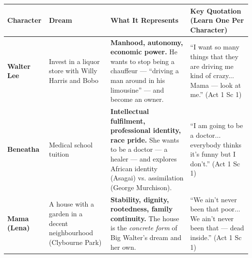 \documentclass[11pt]{article}
\begin{document}
\begin{center}
\begin{tabularx}{\linewidth}{|l|X|X|X|}\hline
\rowcolor{popblueL}
\textbf{Character} & \textbf{Dream} & \textbf{What It Represents} & \textbf{Key Quotation (Learn One Per Character)} \\ \hline
\textbf{Walter Lee} & Invest in a liquor store with Willy Harris and Bobo & \textbf{Manhood, autonomy, economic power.} He wants to stop being a chauffeur — ``driving a man around in his limousine'' — and become an owner. & ``I want so many things that they are driving me kind of crazy... Mama — look at me.'' (Act 1 Sc 1) \\ \hline
\textbf{Beneatha} & Medical school tuition & \textbf{Intellectual fulfilment, professional identity, race pride.} She wants to be a doctor — a healer — and explores African identity (Asagai) vs. assimilation (George Murchison). & ``I am going to be a doctor... everybody thinks it's funny but I don't.'' (Act 1 Sc 1) \\ \hline
\textbf{Mama (Lena)} & A house with a garden in a decent neighbourhood (Clybourne Park) & \textbf{Stability, dignity, rootedness, family continuity.} The house is the \emph{concrete form} of Big Walter's dream and her own. & ``We ain't never been that poor... We ain't never been that — dead inside.'' (Act 1 Sc 1) \\ \hline
\end{tabularx}
\end{center}
\end{document}

